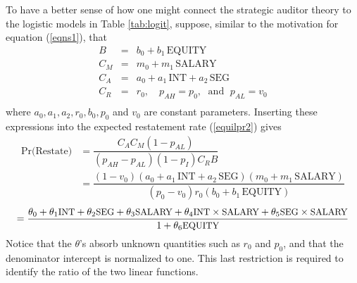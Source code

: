 To have a better sense of how one might connect the strategic auditor theory to the
logistic models in Table \ref{tab:logit}, suppose, similar to the motivation for equation (\ref{eqns1}), that 
\begin{equation}\begin{array}{lcl}\label{eqns2}
B & = & b_0 + b_1 \, \mbox{EQUITY} \\[.5em]
C_M & = & m_0 + m_1 \, \mbox{SALARY} \\[.5em]
C_A & = & a_0 + a_1 \, \mbox{INT} + a_2 \, \mbox{SEG}\\[.5em]
C_R & = & r_0, \quad p_{AH}   =  p_0, \; \mbox{ and } \; p_{AL}  =  v_0 \\[.5em]
\end{array}
\end{equation}
where $ a_0, a_1, a_2, r_0, b_0, p_0$ and $v_0$ are constant parameters. 
Inserting these expressions into the expected restatement rate (\ref{equilpr2}) gives
\begin{align*} \label{equilpr3}
\mbox{Pr(Restate)} & =   \dfrac{C_AC_M(1-p_{AL})}{(p_{AH}-p_{AL})(1-p_I)C_RB} \\
&= \dfrac{(1-v_0)(a_0 + a_1 \, \mbox{INT} + a_2 \, \mbox{SEG})(m_0 + m_1 \, \mbox{SALARY})}
{(p_0-v_0)r_0(b_0 + b_1 \, \mbox{EQUITY})}
\end{align*}
\begin{equation}\label{equilpr4}
 =  \dfrac{\theta_0 + \theta_1\mbox{\small INT} + \theta_2\mbox{\small SEG} + \theta_3\mbox{\small SALARY}
+ \theta_4\mbox{\small INT} \times \mbox{\small SALARY}+ \theta_5\mbox{\small SEG} \times \mbox{\small SALARY}}
{1 +  \theta_6\mbox{\small EQUITY}}
\end{equation}
Notice that the $\theta$'s absorb unknown quantities such as $r_0$ and $p_0$, and that the denominator intercept
is normalized to one. This last restriction is required to identify the ratio of the two linear functions.

